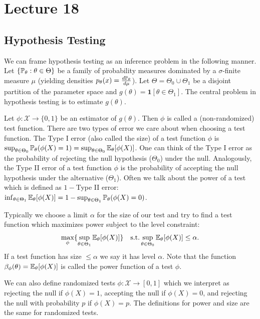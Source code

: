 \newpage
\section{Lecture 18}

\subsection{Hypothesis Testing}

We can frame hypothesis testing as an inference problem in the following manner. Let $\{\mathbb{P}_\theta : \theta \in \Theta \}$ be a family of probability measures dominated by a $\sigma$-finite measure $\mu$ (yielding densities $p_\theta(x) = \frac{d\mathbb{P}_\theta}{d\mu}$). Let $\Theta = \Theta_0 \cup \Theta_1$ be a disjoint partition of the parameter space and $g(\theta) = \mathbf{1}[\theta \in \Theta_1]$. The central problem in hypothesis testing is to estimate $g(\theta)$. 

\medskip \noindent Let $\phi: \mathcal X \to \{0, 1\}$ be an estimator of $g(\theta)$. Then $\phi$ is called a (non-randomized) test function. There are two types of error we care about when choosing a test function. The Type I error (also called the size) of a test function $\phi$ is $\sup_{\theta \in \Theta_0} \mathbb{P}_\theta(\phi(X) = 1) = \sup_{\theta \in \Theta_0} \mathbb{E}_\theta[\phi(X)]$.
One can think of the Type I error as the probability of rejecting the null hypothesis ($\Theta_0$) under the null. Analogously, the Type II error of a test function $\phi$ is the probability of accepting the null hypothesis under the alternative ($\Theta_1$). Often we talk about the power of a test which is defined as $1 -$Type II error: $ \inf_{\theta \in \Theta_1} \mathbb{E}_\theta[\phi(X)] = 1 - \sup_{\theta \in \Theta_1} \mathbb{P}_\theta(\phi(X) = 0)$.

\medskip \noindent Typically we choose a limit $\alpha$ for the size of our test and try to find a test function which maximizes power subject to the level constraint:
\[
	\max_{\phi} \{ \sup_{\theta \in \Theta_1} \mathbb{E}_\theta[\phi(X)] \} \quad \text{s.t.} \sup_{\theta \in \Theta_0} \mathbb{E}_\theta[\phi(X)] \leq \alpha.
\]
If a test function has size $\le \alpha$ we say it has level $\alpha$. Note that the function $\beta_\phi(\theta) = \mathbb{E}_\theta[\phi(X)]$ is called the power function of a test $\phi$. 

\medskip \noindent We can also define randomized tests $\phi : \mathcal X \to [0, 1]$ which we interpret as rejecting the null if $\phi(X) = 1$, accepting the null if $\phi(X) = 0$, and rejecting the null with probability $p$ if $\phi(X) = p$. The definitions for power and size are the same for randomized tests.

